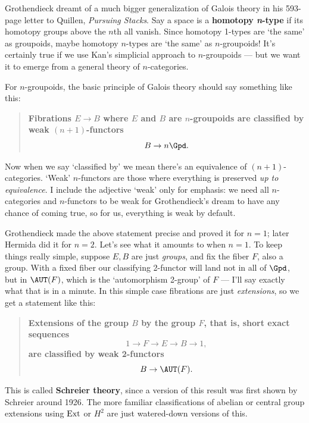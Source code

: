 \documentclass{amsart}
\begin{document}
Grothendieck dreamt of a much bigger generalization of Galois 
theory in his 593-page letter to Quillen, {\it Pursuing Stacks}.  
Say a space is a \textbf{homotopy \textit{n}-type} 
if its homotopy groups above the $n$th all vanish.  Since
homotopy 1-types are `the same' as groupoids,
maybe homotopy $n$-types are `the same' as $n$-groupoids!
It's certainly true if we use Kan's simplicial approach to
$n$-groupoids --- but we want it to emerge from a general theory
of $n$-categories.  

For $n$-groupoids, the basic principle of Galois
theory should say something like this:

\begin{quote}
\textbf{Fibrations $E \to B$ where $E$ and $B$ are 
$n$-groupoids are classified by weak $(n+1)$-functors 
\[     B \to n\Gpd. \]}
\end{quote}

\noindent
Now when we say `classified by' we mean there's an
equivalence of $(n+1)$-categories.  `Weak' $n$-functors
are those where everything is preserved {\it up to equivalence}. 
I include the adjective `weak' only for emphasis: we
need all $n$-categories and $n$-functors to be weak 
for Grothendieck's dream to have any chance of coming true,
so for us, everything is weak by default.

Grothendieck made the above statement precise and proved it
for $n = 1$; later Hermida did it for $n = 2$.
Let's see what it amounts to when $n = 1$.  To keep things
really simple, suppose $E,B$ are 
just {\it groups}, and fix the fiber $F$, also a group.
With a fixed fiber our classifying 2-functor will land not in 
all of $\Gpd$, but in $\AUT(F)$, which is the `automorphism 2-group' 
of $F$ --- I'll say exactly what that is in a minute.
In this simple case fibrations are just {\it extensions},
so we get a statement like this:

\begin{quote}
\textbf{Extensions of the group $B$ by the group 
$F$, that is, short exact sequences 
\[          1 \to F \to E \to B \to 1,  \]
are classified by weak 2-functors 
\[               B \to \AUT(F) .\]
}
\end{quote}

\noindent
This is called {\bf Schreier theory}, since a version of this result
was first shown by Schreier around 1926.  The more familiar classifications 
of abelian or central group extensions using ${\rm Ext}$ or $H^2$ are just
watered-down versions of this.
\end{document}
